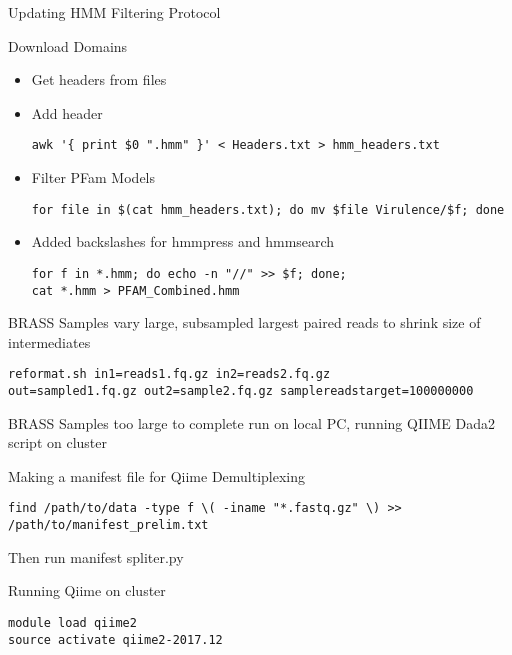 \documentclass[idxtotoc,hyperref,openany,oneside]{labbook} %
\begin{document}

Updating HMM Filtering Protocol

Download Domains

\begin{itemize}
\item Get headers from files
\item Add header 
\begin{verbatim}
awk '{ print $0 ".hmm" }' < Headers.txt > hmm_headers.txt
\end{verbatim}
\item Filter PFam Models
\begin{verbatim}
for file in $(cat hmm_headers.txt); do mv $file Virulence/$f; done
\end{verbatim}

\item Added backslashes for hmmpress and hmmsearch
\begin{verbatim}
for f in *.hmm; do echo -n "//" >> $f; done; 
cat *.hmm > PFAM_Combined.hmm

\end{verbatim}

\end{itemize}





BRASS Samples vary large, subsampled largest paired reads to shrink size of intermediates

\begin{verbatim}
reformat.sh in1=reads1.fq.gz in2=reads2.fq.gz 
out=sampled1.fq.gz out2=sample2.fq.gz samplereadstarget=100000000

\end{verbatim}

BRASS Samples too large to complete run on local PC, running QIIME Dada2 script on cluster

Making a manifest file for Qiime Demultiplexing
\begin{verbatim}
find /path/to/data -type f \( -iname "*.fastq.gz" \) >> 
/path/to/manifest_prelim.txt
\end{verbatim}
Then run manifest spliter.py

Running Qiime on cluster
\begin{verbatim}
module load qiime2
source activate qiime2-2017.12
\end{verbatim}
\end{document}
